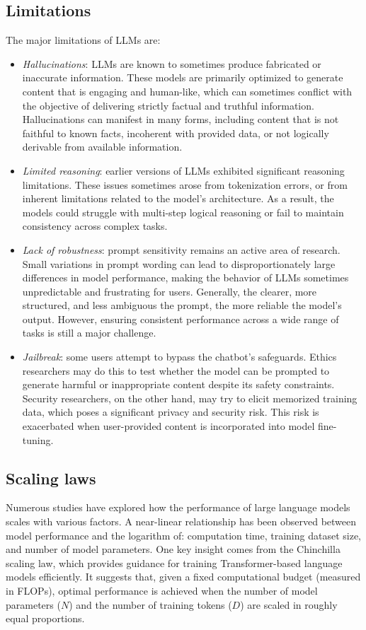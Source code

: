 \subsection{Limitations}
The major limitations of LLMs are: 
\begin{itemize}
    \item \textit{Hallucinations}: LLMs are known to sometimes produce fabricated or inaccurate information. 
        These models are primarily optimized to generate content that is engaging and human-like, which can sometimes conflict with the objective of delivering strictly factual and truthful information.
        Hallucinations can manifest in many forms, including content that is not faithful to known facts, incoherent with provided data, or not logically derivable from available information.
    \item \textit{Limited reasoning}: earlier versions of LLMs exhibited significant reasoning limitations. 
        These issues sometimes arose from tokenization errors, or from inherent limitations related to the model's architecture. 
        As a result, the models could struggle with multi-step logical reasoning or fail to maintain consistency across complex tasks.
    \item \textit{Lack of robustness}: prompt sensitivity remains an active area of research. 
        Small variations in prompt wording can lead to disproportionately large differences in model performance, making the behavior of LLMs sometimes unpredictable and frustrating for users.
        Generally, the clearer, more structured, and less ambiguous the prompt, the more reliable the model's output. 
        However, ensuring consistent performance across a wide range of tasks is still a major challenge.
    \item\textit{Jailbreak}: some users attempt to bypass the chatbot's safeguards. 
        Ethics researchers may do this to test whether the model can be prompted to generate harmful or inappropriate content despite its safety constraints. 
        Security researchers, on the other hand, may try to elicit memorized training data, which poses a significant privacy and security risk. 
        This risk is exacerbated when user-provided content is incorporated into model fine-tuning.
\end{itemize}

\subsection{Scaling laws}
Numerous studies have explored how the performance of large language models scales with various factors. 
A near-linear relationship has been observed between model performance and the logarithm of: computation time, training dataset size, and number of model parameters.
One key insight comes from the Chinchilla scaling law, which provides guidance for training Transformer-based language models efficiently. 
It suggests that, given a fixed computational budget (measured in FLOPs), optimal performance is achieved when the number of model parameters ($N$) and the number of training tokens ($D$) are scaled in roughly equal proportions.

